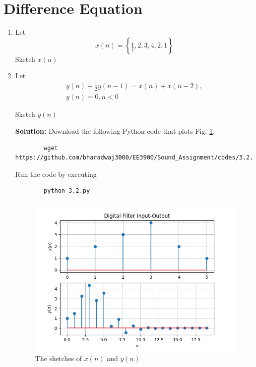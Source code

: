 \documentclass[journal,12pt,twocolumn]{IEEEtran}
\newcommand{\solution}{\noindent \textbf{Solution: }}
\providecommand{\cbrak}[1]{\ensuremath{\left\{#1\right\}}}
\numberwithin{equation}{section}
\renewcommand\thesection{\arabic{section}}
\begin{document}
	\section{Difference Equation}
	\begin{enumerate}[label=\thesection.\arabic*,ref=\thesection.\theenumi]
	\item Let
	\begin{equation}
		\label{eq:filter_input}
		x(n) = \cbrak{\underset{\uparrow}{1},2,3,4,2,1}
	\end{equation}
	Sketch $x(n)$
	\item Let
	\begin{multline}
		\label{eq:iir_filter}
		y(n) + \frac{1}{2}y(n-1) = x(n) + x(n-2), \\
 		y(n) = 0, n < 0
	\end{multline}
	
	Sketch $y(n)$

	\solution Download the following Python code that plots Fig. \ref{fig-3.2}.
	\begin{lstlisting}
		wget https://github.com/bharadwaj3000/EE3900/Sound_Assignment/codes/3.2.py
	\end{lstlisting}
	
	Run the code by executing
	\begin{lstlisting}
		python 3.2.py
	\end{lstlisting}

	\begin{figure}[!ht]
		\centering
		\includegraphics[width=\columnwidth]{./figs/3.2.png}
		\caption{The sketches of $x(n)$ and $y(n)$}
		\label{fig-3.2}	
	\end{figure}
	

\end{enumerate}
\end{document}
